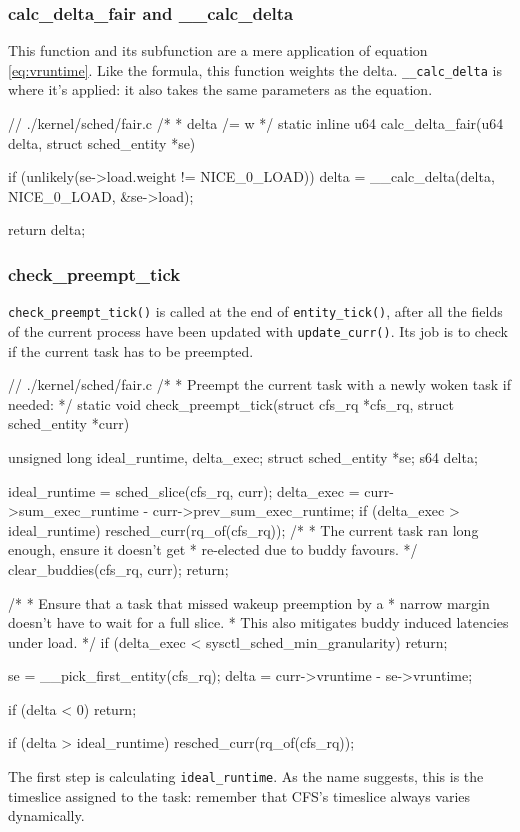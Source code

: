 \subsubsection{calc\_delta\_fair and \_\_calc\_delta}
This function and its subfunction are a mere application of equation \ref{eq:vruntime}. Like the formula, this function weights the delta. \verb|__calc_delta| is where it's applied: it also takes the same parameters as the equation. 
\begin{code}
// ./kernel/sched/fair.c
/*
 * delta /= w
 */
static inline u64 calc_delta_fair(u64 delta, struct sched_entity *se)
{
	if (unlikely(se->load.weight != NICE_0_LOAD))
		delta = __calc_delta(delta, NICE_0_LOAD, &se->load);

	return delta;
}
\end{code}
\subsubsection{check\_preempt\_tick}

\verb|check_preempt_tick()| is called at the end of \verb|entity_tick()|, after all the fields of the current process have been updated with \verb|update_curr()|. Its job is to check if the current task has to be preempted. 
\begin{code}
// ./kernel/sched/fair.c
/*
 * Preempt the current task with a newly woken task if needed:
 */
static void
check_preempt_tick(struct cfs_rq *cfs_rq, struct sched_entity *curr)
{
	unsigned long ideal_runtime, delta_exec;
	struct sched_entity *se;
	s64 delta;

	ideal_runtime = sched_slice(cfs_rq, curr);
	delta_exec = curr->sum_exec_runtime - curr->prev_sum_exec_runtime;
	if (delta_exec > ideal_runtime) {
		resched_curr(rq_of(cfs_rq));
		/*
		 * The current task ran long enough, ensure it doesn't get
		 * re-elected due to buddy favours.
		 */
		clear_buddies(cfs_rq, curr);
		return;
	}

	/*
	 * Ensure that a task that missed wakeup preemption by a
	 * narrow margin doesn't have to wait for a full slice.
	 * This also mitigates buddy induced latencies under load.
	 */
	if (delta_exec < sysctl_sched_min_granularity)
		return;

	se = __pick_first_entity(cfs_rq);
	delta = curr->vruntime - se->vruntime;

	if (delta < 0)
		return;

	if (delta > ideal_runtime)
		resched_curr(rq_of(cfs_rq));
}
\end{code}
The first step is calculating \verb|ideal_runtime|. As the name suggests, this is the timeslice assigned to the task: remember that CFS's timeslice always varies dynamically.

